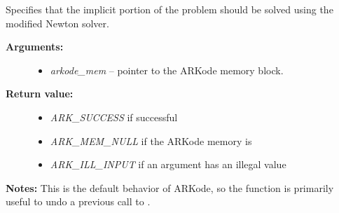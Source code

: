 \documentclass[letterpaper,10pt,english]{sphinxmanual}
\begin{document}
\begin{fulllineitems}
\label{c_interface/User_callable:c.ARKodeSetNewton}
Specifies that the implicit portion of the problem should be solved
using the modified Newton solver.
\begin{description}
\item[{\textbf{Arguments:}}] \leavevmode\begin{itemize}
\item {} 
\emph{arkode\_mem} -- pointer to the ARKode memory block.

\end{itemize}

\item[{\textbf{Return value:}}] \leavevmode\begin{itemize}
\item {} 
\emph{ARK\_SUCCESS} if successful

\item {} 
\emph{ARK\_MEM\_NULL} if the ARKode memory is 

\item {} 
\emph{ARK\_ILL\_INPUT} if an argument has an illegal value

\end{itemize}

\end{description}

\textbf{Notes:} This is the default behavior of ARKode, so the function
is primarily useful to undo a previous call to {\hyperref[c_interface/User_callable:c.ARKodeSetFixedPoint]{\emph{}}}.

\end{fulllineitems}

\end{document}

